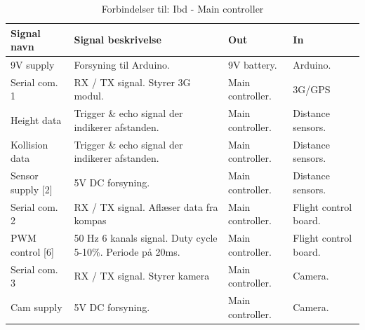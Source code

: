\begin{table}[H]
	\centering
		\begin{tabular}{|p{2.6 cm}|p{4.9 cm}|p{2.5 cm}|p{2.5 cm}|}  
		\hline
			\textbf{Signal navn} 	& \textbf{Signal beskrivelse}		& \textbf{Out} 				& \textbf{In}     \\ \hline
			9V supply & Forsyning til Arduino. & 9V battery. & Arduino. 		    \\ \hline
			Serial com. 1		& RX / TX signal. Styrer 3G modul. 	& Main controller. 	& 3G/GPS    \\ \hline
			Height data		& Trigger \& echo signal der indikerer afstanden. 	& Main controller.	& Distance sensors.	\\ \hline
			Kollision data	& Trigger \& echo signal der indikerer afstanden. 	& Main controller.	& Distance sensors.  \\ \hline
			Sensor supply [2]	& 5V DC forsyning.	& Main controller. & Distance sensors.	\\ \hline
			Serial com. 2		& RX / TX signal. Aflæser data fra kompas & Main controller.				& Flight control board. 	\\ \hline 
			PWM control [6]		& 50 Hz 6 kanals signal. Duty cycle 5-10\%. Periode på 20ms.	& Main controller.				& Flight control board.	\\ \hline
			Serial com. 3		& RX / TX signal. Styrer kamera	& Main controller.	& Camera.	\\ \hline
			Cam supply			& 5V DC forsyning. 	& Main controller.	& Camera.	\\ \hline 
		\end{tabular}
	\caption{Forbindelser til: Ibd - Main controller}
	\label{tab:IBDMaincontroller}
\end{table}

